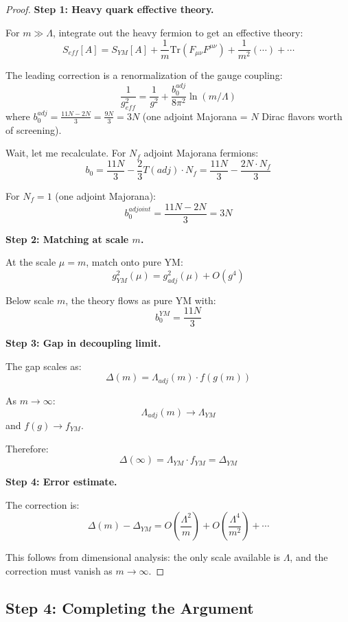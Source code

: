 \begin{proof}
\textbf{Step 1: Heavy quark effective theory.}

For $m \gg \Lambda$, integrate out the heavy fermion to get an effective theory:
\[
S_{eff}[A] = S_{YM}[A] + \frac{1}{m}\mathrm{Tr}(F_{\mu\nu}F^{\mu\nu}) + \frac{1}{m^2}(\cdots) + \cdots
\]

The leading correction is a renormalization of the gauge coupling:
\[
\frac{1}{g_{eff}^2} = \frac{1}{g^2} + \frac{b_0^{adj}}{8\pi^2}\ln(m/\Lambda)
\]
where $b_0^{adj} = \frac{11N - 2N}{3} = \frac{9N}{3} = 3N$ (one adjoint Majorana = 
$N$ Dirac flavors worth of screening).

Wait, let me recalculate. For $N_f$ adjoint Majorana fermions:
\[
b_0 = \frac{11N}{3} - \frac{2}{3} T(adj) \cdot N_f = \frac{11N}{3} - \frac{2N \cdot N_f}{3}
\]

For $N_f = 1$ (one adjoint Majorana):
\[
b_0^{adjoint} = \frac{11N - 2N}{3} = 3N
\]

\textbf{Step 2: Matching at scale $m$.}

At the scale $\mu = m$, match onto pure YM:
\[
g_{YM}^2(\mu) = g_{adj}^2(\mu) + O(g^4)
\]

Below scale $m$, the theory flows as pure YM with:
\[
b_0^{YM} = \frac{11N}{3}
\]

\textbf{Step 3: Gap in decoupling limit.}

The gap scales as:
\[
\Delta(m) = \Lambda_{adj}(m) \cdot f(g(m))
\]

As $m \to \infty$:
\[
\Lambda_{adj}(m) \to \Lambda_{YM}
\]
and $f(g) \to f_{YM}$.

Therefore:
\[
\Delta(\infty) = \Lambda_{YM} \cdot f_{YM} = \Delta_{YM}
\]

\textbf{Step 4: Error estimate.}

The correction is:
\[
\Delta(m) - \Delta_{YM} = O\left(\frac{\Lambda^2}{m}\right) + O\left(\frac{\Lambda^4}{m^2}\right) + \cdots
\]

This follows from dimensional analysis: the only scale available is $\Lambda$, 
and the correction must vanish as $m \to \infty$.
\end{proof}

\subsection{Step 4: Completing the Argument}

